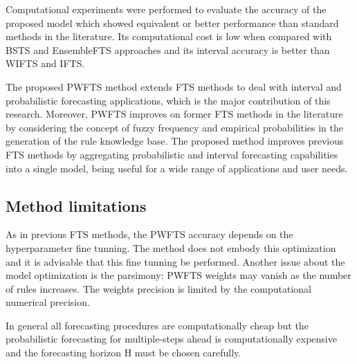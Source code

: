 Computational experiments were performed to evaluate the accuracy of the proposed model which showed equivalent or better performance than standard methods in the literature. Its computational cost is low when compared with BSTS and EnsembleFTS approaches and its interval accuracy is better than WIFTS and IFTS.

The proposed PWFTS method extends FTS methods to deal with interval and probabilistic forecasting applications, which is the major contribution of this research. Moreover, PWFTS improves on former FTS methods in the literature by considering the concept of fuzzy frequency and empirical probabilities in the generation of the rule knowledge base. The proposed method improves previous FTS methods by aggregating probabilistic and interval forecasting capabilities into a single model, being useful for a wide range of applications and user needs.

\subsection{Method limitations}

As in previous FTS methods, the PWFTS accuracy depends on the hyperparameter fine tunning. The method does not embody this optimization and it is advisable that this fine tunning be performed. Another issue about the model optimization is the parsimony: PWFTS weights may vanish as the number of rules increases. The weights precision is limited by the computational numerical precision. 

In general all forecasting procedures are computationally cheap but the probabilistic forecasting for multiple-steps ahead is computationally expensive and the forecasting horizon H must be chosen carefully.
